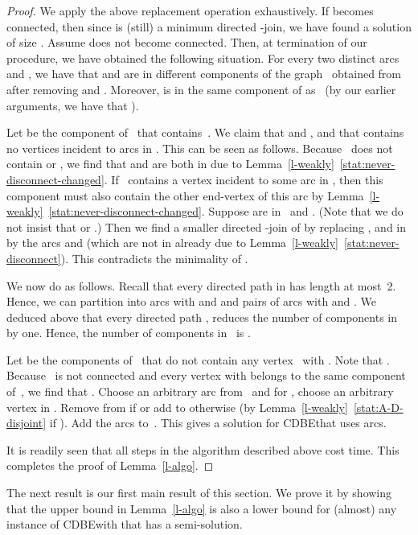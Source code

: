 \documentclass[11pt]{llncs}
\newcommand{\cdbe}{{\sc CDBE}}
\begin{document}
\begin{proof}
We apply the above replacement operation exhaustively.  If  becomes
connected, then since  is (still) a minimum directed -join, we have found
a solution of size .  Assume  does not become connected. Then, at
termination of our procedure, we have obtained the following situation.  For
every two distinct arcs  and , we have that  and  are in
different components of the graph~ obtained from  after removing 
and . Moreover,  is in the same component of  as~ (by our
earlier arguments, we have that ).

Let  be the component of~ that contains~.
We claim that  and , and that  contains no vertices incident to arcs in . This can be seen as follows.  Because~ does not contain  or , we find that  and  are both
in  due to Lemma~\ref{l-weakly}~\ref{stat:never-disconnect-changed}. If~
contains a vertex incident to some arc in , then this component must also contain the other end-vertex of
this arc by Lemma~\ref{l-weakly}~\ref{stat:never-disconnect-changed}. Suppose  are in~ and . (Note
that we do not insist that  or .) Then we find a smaller
directed -join of  by replacing ,  and  in~
by the arcs  and  (which are not in  already due to Lemma~\ref{l-weakly}~\ref{stat:never-disconnect}). This contradicts the
minimality of .

We now do as follows.  Recall that every directed path in  has length at
most~2.  Hence, we can partition  into  arcs  with  and
 and  pairs of arcs  with  and
.  We deduced above that every directed path ,  reduces
the number of components in  by one.  Hence, the number of components in~
is .  

Let  be the components of~ that do not contain any
vertex~ with . Note that .
Because~ is not connected and every vertex  with
 belongs to the same component of~, we find that .
Choose an arbitrary arc  from~ and for ,  choose
an arbitrary vertex  in .  Remove  from  if 
or add  to   otherwise (by Lemma~\ref{l-weakly}~\ref{stat:A-D-disjoint} 
if ).  Add the arcs
 to~.  This gives a
solution for \cdbe that uses
 arcs.

\medskip
\noindent
It is readily seen that all steps in the algorithm described above cost 
time. 
This completes the proof of Lemma~\ref{l-algo}.
\end{proof}


\noindent
The next result is our first main result of this section. 
We prove it by showing that the upper bound in Lemma~\ref{l-algo} is also a lower bound for (almost) any instance of \cdbe with  that has a semi-solution.
\end{document}

